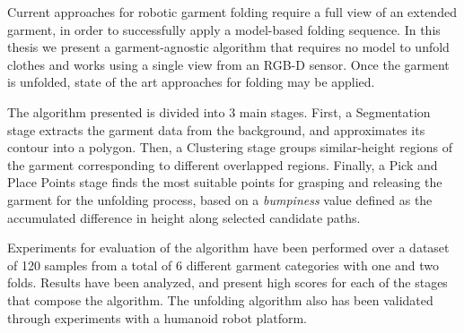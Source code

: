 Current approaches for robotic garment folding require a full view of an extended garment, in order to successfully apply a model-based folding sequence.
In this thesis we present a garment-agnostic algorithm that requires no model to unfold clothes and works using a single view from an RGB-D sensor. Once the garment is unfolded, state of the art approaches for folding may be applied.

The algorithm presented is divided into 3 main stages. First, a Segmentation stage extracts the garment data from the background, and approximates its contour into a polygon. Then, a Clustering stage groups similar-height regions of the garment corresponding to different overlapped regions. Finally, a Pick and Place Points stage finds the most suitable points for grasping and releasing the garment for the unfolding process, based on a \textit{bumpiness} value defined as the accumulated difference in height along selected candidate paths.

Experiments for evaluation of the algorithm have been performed over a dataset of 120 samples from a total of 6 different garment categories with one and two folds. Results have been analyzed, and present high scores for each of the stages that compose the algorithm. The unfolding algorithm also has been validated through experiments with a humanoid robot platform.